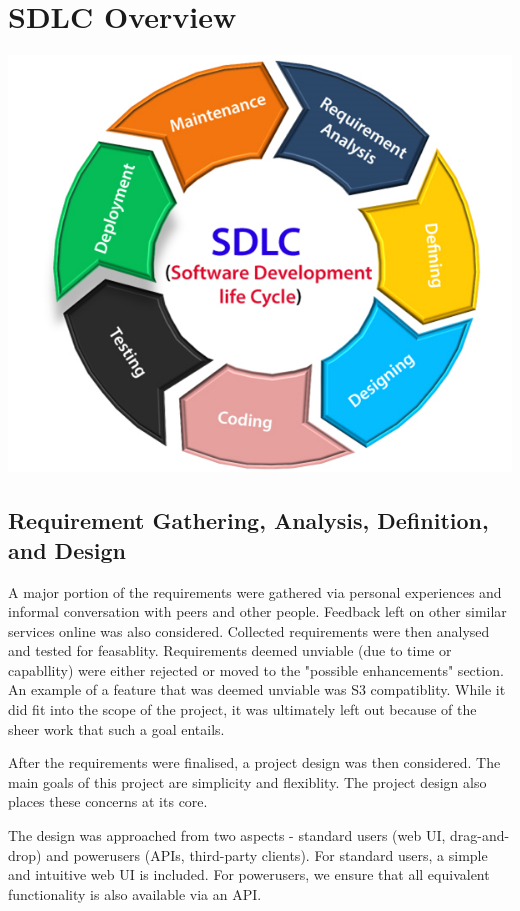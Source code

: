 \documentclass[12pt,a4paper]{report}
\begin{document}
\chapter{SDLC Overview}\label{cha:sdlc_overview}
\includegraphics{se-sdlc.png}
\section{Requirement Gathering, Analysis, Definition, and Design}
A major portion of the requirements were gathered via personal experiences and informal conversation with peers and other people.
Feedback left on other similar services online was also considered.
Collected requirements were then analysed and tested for feasablity.
Requirements deemed unviable (due to time or capabllity) were either rejected or moved to the "possible enhancements" section.
An example of a feature that was deemed unviable was S3 compatiblity.
While it did fit into the scope of the project, it was ultimately left out because of the sheer work that such a goal entails.

After the requirements were finalised, a project design was then considered.
The main goals of this project are simplicity and flexiblity.
The project design also places these concerns at its core.

The design was approached from two aspects - standard users (web UI, drag-and-drop) and powerusers (APIs, third-party clients).
For standard users, a simple and intuitive web UI is included.
For powerusers, we ensure that all equivalent functionality is also available via an API.
\end{document}
